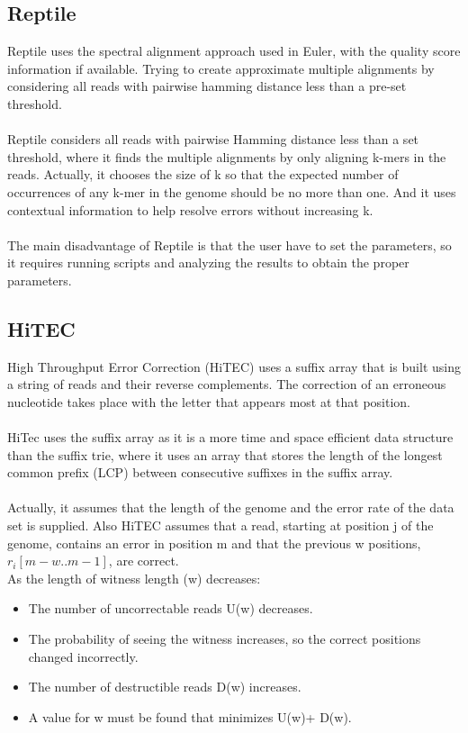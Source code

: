 \documentclass[12pt]{llncs}
\begin{document}
\subsection{Reptile}
Reptile \cite{Reptile} uses the spectral alignment approach used in Euler, with the quality score information if available. Trying to create approximate multiple alignments by considering all reads with pairwise hamming distance less than a pre-set threshold. 
\\
\\
Reptile considers all reads with pairwise Hamming distance less than a set threshold, where it finds the multiple alignments by only aligning k-mers in the reads. Actually, it chooses the size of k so that the expected number of occurrences of any k-mer in the genome should be no more than one. And it uses contextual information to help resolve errors without increasing k.
\\
\\
The main disadvantage of Reptile is that the user have to set the parameters, so it
requires running scripts and analyzing the results to obtain the proper parameters.

\subsection{HiTEC}
High Throughput Error Correction (HiTEC) \cite{HiTec} uses a suffix array that is built using a string of reads and their reverse complements. The correction of an erroneous nucleotide takes place with the letter that appears most at that position.
\\
\\
HiTec uses the suffix array as it is a more time and space efficient data structure than the suffix trie, where it uses an array that stores the length of the longest common prefix (LCP) between consecutive suffixes in the suffix array.
\\
\\
Actually, it assumes that the length of the genome and the error rate of the data set is supplied. Also HiTEC assumes that a read, starting at position j of the genome, contains an error in position m and that the previous w positions, $r_{i} [m - w..m - 1]$, are correct.
\\
As the length of witness length (w) decreases:

\begin{itemize}
	\item The number of uncorrectable reads U(w) decreases.
	\item The probability of seeing the witness increases, so the correct positions changed incorrectly. 
	\item The number of destructible reads D(w) increases.
	\item A value for w must be found that minimizes U(w)+ D(w). 
\end{itemize}
\end{document}
